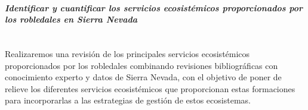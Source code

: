 \paragraph{\emph{Identificar y cuantificar los servicios ecosistémicos proporcionados por los robledales en Sierra Nevada}}\mbox{} \\
Realizaremos una revisión de los principales servicios ecosistémicos proporcionados por los robledales combinando revisiones bibliográficas con conocimiento experto y datos de Sierra Nevada, con el objetivo de poner de relieve los diferentes servicios ecosistémicos que proporcionan estas formaciones para incorporarlas a las estrategias de gestión de estos ecosistemas. 

